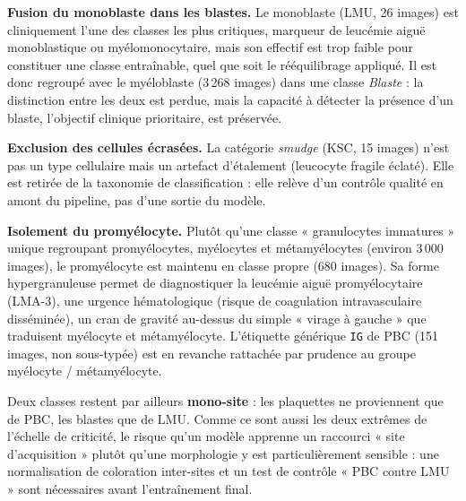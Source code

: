 \textbf{Fusion du monoblaste dans les blastes.} Le monoblaste (LMU, 26 images) est cliniquement l’une des classes les plus critiques, marqueur de leucémie aiguë monoblastique ou myélomonocytaire, mais son effectif est trop faible pour constituer une classe entraînable, quel que soit le rééquilibrage appliqué.
Il est donc regroupé avec le myéloblaste (3\,268 images) dans une classe \emph{Blaste} : la distinction entre les deux est perdue, mais la capacité à détecter la présence d’un blaste, l’objectif clinique prioritaire, est préservée.

\textbf{Exclusion des cellules écrasées.} La catégorie \emph{smudge} (KSC, 15 images) n’est pas un type cellulaire mais un artefact d’étalement (leucocyte fragile éclaté).
Elle est retirée de la taxonomie de classification : elle relève d’un contrôle qualité en amont du pipeline, pas d’une sortie du modèle.

\textbf{Isolement du promyélocyte.} Plutôt qu’une classe « granulocytes immatures » unique regroupant promyélocytes, myélocytes et métamyélocytes (environ 3\,000 images), le promyélocyte est maintenu en classe propre (680 images).
Sa forme hypergranuleuse permet de diagnostiquer la leucémie aiguë promyélocytaire (LMA-3), une urgence hématologique (risque de coagulation intravasculaire disséminée), un cran de gravité au-dessus du simple « virage à gauche » que traduisent myélocyte et métamyélocyte.
L’étiquette générique \texttt{IG} de PBC (151 images, non sous-typée) est en revanche rattachée par prudence au groupe myélocyte / métamyélocyte.

Deux classes restent par ailleurs \textbf{mono-site} : les plaquettes ne proviennent que de PBC, les blastes que de LMU.
Comme ce sont aussi les deux extrêmes de l’échelle de criticité, le risque qu’un modèle apprenne un raccourci « site d’acquisition » plutôt qu’une morphologie y est particulièrement sensible : une normalisation de coloration inter-sites et un test de contrôle « PBC contre LMU » sont nécessaires avant l’entraînement final.

